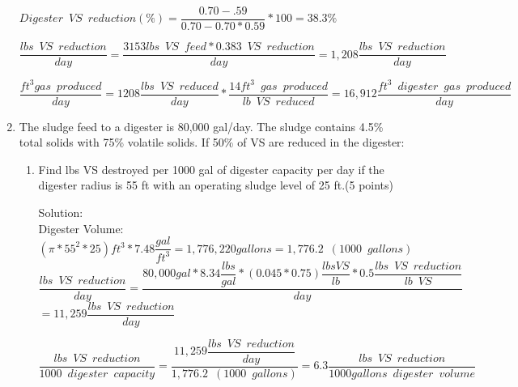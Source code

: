 \documentclass{article}
\begin{document}
\begin{enumerate}
{
$
Digester \enspace VS \enspace reduction (\%)=
	\dfrac
	{0.70 - .59}
	{0.70 - 0.70 *0.59}
	*100=38.3\%
$
}\\
\vspace{6mm}

{
$
	\dfrac
	{
	lbs \enspace VS \enspace reduction
	}
	{
	day
	}
	=
	\dfrac
	{
	3153 lbs \enspace VS \enspace feed
		*  0.383 \enspace VS \enspace reduction
	}
	{
	day
	}
 	=1,208
	\dfrac
	{
	lbs \enspace VS \enspace reduction
	}
	{
	day 
	}
$
}\\
\vspace{6mm}

{
$
	\dfrac 
	{
	ft^3 gas \enspace produced
	}
	{
	day
	}
	=
	1208 \dfrac
			{
			lbs \enspace VS \enspace reduced
			}
			{
			day
			}
			*
		\dfrac
		{
		14 ft^3 \enspace gas \enspace produced
		}
		{
		lb \enspace VS \enspace reduced
		}
		=16,912 \dfrac
				{
				ft^3 \enspace digester \enspace 					gas \enspace produced
				}
				{
				day
				}
$
} 
\item The sludge feed to a digester is 80,000 gal/day. The sludge contains 4.5\% total solids with 75\% volatile solids. If 50\% of VS are reduced in the digester: 



\begin{enumerate}
\item Find lbs VS destroyed per 1000 gal of digester capacity per day if the digester radius is 55 ft with an operating sludge level of 25 ft.(5 points)

\vspace{1cm}
Solution:\\
Digester Volume: 
$
{
		(\pi*55^2*25)ft^3 *7.48 \dfrac{gal}{ft^3}
	}=1,776,220 gallons=1,776.2 \enspace(1000 \enspace gallons)
$
\\
\vspace{3mm}
$
	\dfrac
	{
	lbs \enspace VS \enspace reduction
	}
	{
	day
	}
	=
	\dfrac
	{
	80,000 gal * 8.34 \dfrac{lbs}{gal}*(0.045*0.75) \dfrac{lbs VS}{lb}*0.5\dfrac{lbs \enspace VS \enspace  reduction}{lb \enspace VS}
	}
	{
	day
	}$\\
\vspace{0.5cm}
$
 	=11,259
	\dfrac
	{
	lbs \enspace VS \enspace reduction
	}
	{
	day 
	}
$
\\
\vspace{3mm}


$
	\dfrac
	{
	lbs \enspace VS \enspace reduction
	}
	{
	1000 \enspace digester \enspace capacity
	}
	=
	\dfrac
	{
	11,259 \dfrac
			{
			lbs \enspace VS \enspace reduction
			}
			{
			day
			}
	}
	{	
	1,776.2 \enspace (1000 \enspace gallons)
	}
 	=\boxed{6.3
	\dfrac
	{
	lbs \enspace VS \enspace reduction
	}
	{
	1000 gallons \enspace digester \enspace volume 
	}}
$
\\


\end{enumerate}
\end{enumerate}
\end{document}
